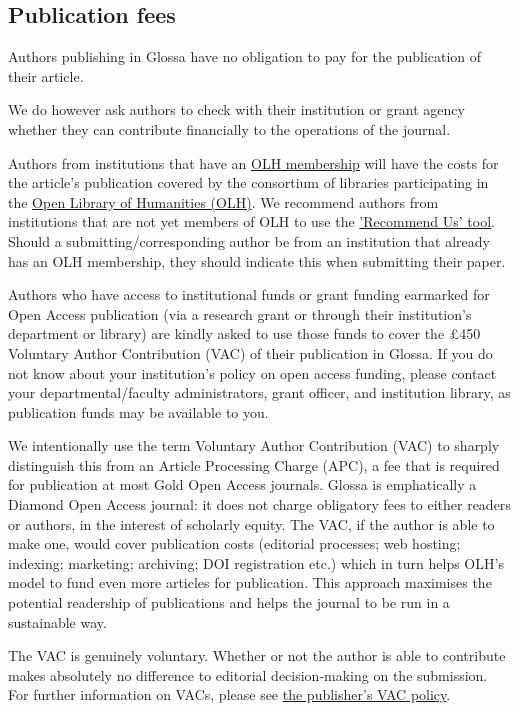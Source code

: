\documentclass[charis,linguex]{glossa}
\begin{document}
\subsection{Publication fees}

Authors publishing in Glossa have no obligation to pay for the publication of their article.

We do however ask authors to check with their institution or grant agency whether they can contribute financially to the operations of the journal.

Authors from institutions that have an \href{https://www.openlibhums.org/plugins/supporters/}{OLH membership} will have the costs for the article's publication covered by the consortium of libraries participating in the \href{https://www.openlibhums.org/}{Open Library of Humanities (OLH)}. We recommend authors from institutions that are not yet members of OLH to use the \href{https://www.openlibhums.org/plugins/supporters/recommend-us/}{'Recommend Us' tool}. Should a submitting/corresponding author be from an institution that already has an OLH membership, they should indicate this when submitting their paper. 

Authors who have access to institutional funds or grant funding earmarked for Open Access publication (via a research grant or through their institution's department or library) are kindly asked to use those funds to cover the £450 Voluntary Author Contribution (VAC) of their publication in Glossa. If you do not know about your institution’s policy on open access funding, please contact your departmental/faculty administrators, grant officer, and institution library, as publication funds may be available to you.

We intentionally use the term Voluntary Author Contribution (VAC) to sharply distinguish this from an Article Processing Charge (APC), a fee that is required for publication at most Gold Open Access journals. Glossa is emphatically a Diamond Open Access journal: it does not charge obligatory fees to either readers or authors, in the interest of scholarly equity. The VAC, if the author is able to make one, would cover publication costs (editorial processes; web hosting; indexing; marketing; archiving; DOI registration etc.) which in turn helps OLH's model to fund even more articles for publication. This approach maximises the potential readership of publications and helps the journal to be run in a sustainable way.

The VAC is genuinely voluntary. Whether or not the author is able to contribute makes absolutely no difference to editorial decision-making on the submission. For further information on VACs, please see \href{https://www.openlibhums.org/site/vacs/}{the publisher's VAC policy}.
\end{document}
